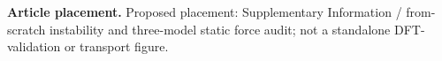 \textbf{Article placement.} Proposed placement: Supplementary Information / from-scratch instability and three-model static force audit; not a standalone DFT-validation or transport figure.
